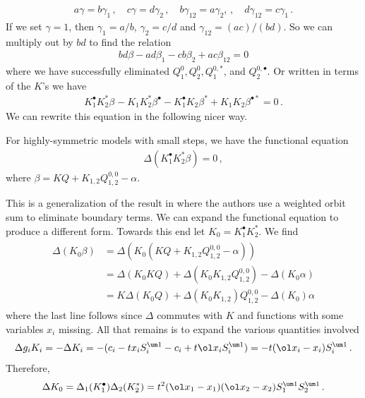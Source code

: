 \begin{align}
	a\gamma = b\gamma_1\,,\quad c\gamma = d\gamma_2\,, \quad b\gamma_{12} = a \gamma_2,\,,\quad d\gamma_{12} = c\gamma_1\,.
\end{align}
If we set $\gamma = 1$, then $\gamma_1 = a/b$, $\gamma_2 = c/d$ and $\gamma_{12} = (ac)/(bd)$. So we can multiply out by $bd$ to find the relation
\begin{align}
	bd\beta-ad\beta_1-cb \beta_2+ac \beta_{12} = 0
\end{align}
where we have successfully eliminated $Q_1^0, Q_2^0, Q_1^{0,\ast}$, and $  Q_2^{0,\bullet}$. Or written in terms of the $K$'s we have
\begin{align}
	K_1^{\bullet}K_2^{\ast}\beta^{}-K_1^{}K_2^{\ast}\beta^{\bullet}-K_1^{\bullet}K_2^{}\beta^{\ast}+K_1^{}K_2^{}\beta^{\bullet\ast} = 0\,.
\end{align}
We can rewrite this equation in the following nicer way.
\begin{theorem} For highly-symmetric models with small steps, we have the functional equation
\begin{align}
	\Delta(K_1^\bullet K_2^\ast \beta) = 0\,,
\end{align}
where $\beta = KQ + K_{1,2}Q_{1,2}^{0,0} -\alpha$.
\end{theorem}
This is a generalization of the result in \cite{wong2014confining} where the authors use a weighted orbit sum to eliminate boundary terms. We can expand the functional equation to produce a different form. Towards this end let $K_0 = K_1^\bullet K_2^\ast$. We find
\begin{align}\begin{split}
	\Delta(K_0\beta) &= \Delta(K_0(KQ + K_{1,2}Q_{1,2}^{0,0} - \alpha)) \\
	&= \Delta(K_0 KQ) +\Delta(K_0 K_{1,2}Q_{1,2}^{0,0}) - \Delta(K_0\alpha)\\
	&= K\Delta(K_0 Q) + \Delta(K_0 K_{1,2})Q_{1,2}^{0,0} - \Delta(K_0)\alpha
\end{split}\end{align}
where the last line follows since $\Delta$ commutes with $K$ and functions with some variables $x_i$ missing. All that remains is to expand the various quantities involved
\begin{align}
	\Delta g_iK_i = - \Delta K_i = - (c_i-tx_iS_i^{\um 1}-c_i + t\ol x_i S_i^{\um 1}) = -t(\ol x_i-x_i)S_i^{\um 1}\,.
\end{align}
Therefore,
\begin{align}
	\Delta K_0 = \Delta_1 (K_1^\bullet) \Delta_2 (K_2^\ast) = t^2(\ol x_1-x_1)(\ol x_2-x_2)S_1^{\um 1}S_2^{\um 1}\,.
\end{align}
